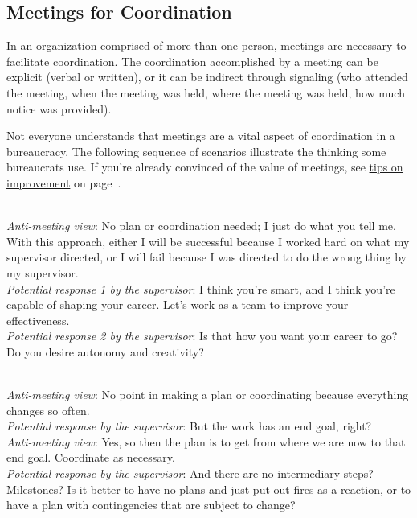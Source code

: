 \subsection*{Meetings for Coordination\label{sec:meetings-for-coordination}}

In an organization comprised of more than one person, meetings are necessary to facilitate coordination. The coordination accomplished by a meeting can be explicit (verbal or written), or it can be indirect through signaling (who attended the meeting, when the meeting was held, where the meeting was held, how much notice was provided). 

Not everyone understands that meetings are a vital aspect of coordination in a bureaucracy. The following sequence of scenarios illustrate the thinking some bureaucrats use.
If you're already convinced of the value of meetings, see \hyperref[sec:well-run-meeting]{tips on improvement}
on page~\pageref{sec:well-run-meeting}.


\ \\
\textit{Anti-meeting view}: No plan or coordination needed; I just do what you tell me. With this approach, either I will be successful because I worked hard on what my supervisor directed, or I will fail because I was directed to do the wrong thing by my supervisor.\\
\textit{Potential response 1 by the supervisor}: I think you're smart, and I think you're capable of shaping your career. Let's work as a team to improve your effectiveness. \\
\textit{Potential response 2 by the supervisor}: Is that how you want your career to go? Do you desire autonomy and creativity?

\ \\
\textit{Anti-meeting view}: No point in making a plan or coordinating because everything changes so often. \\
\textit{Potential response by the supervisor}: But the work has an end goal, right?\\
\textit{Anti-meeting view}:  Yes, so then the plan is to get from where we are now to that end goal. Coordinate as necessary. \\
\textit{Potential response by the supervisor}: And there are no intermediary steps? Milestones?
Is it better to have no plans and just put out fires as a reaction, or to have a plan with contingencies that are subject to change? %

